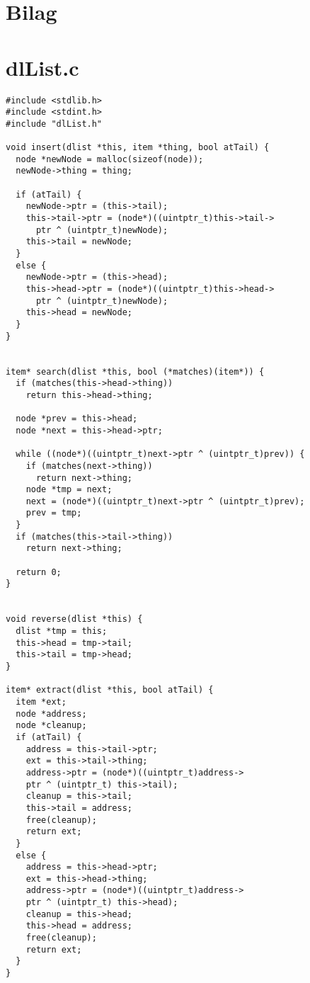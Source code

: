 \documentclass[a4paper,12pt]{article}
\begin{document}
\section*{Bilag}

\section*{dlList.c}
\begin{lstlisting}
#include <stdlib.h>
#include <stdint.h>
#include "dlList.h"

void insert(dlist *this, item *thing, bool atTail) {
  node *newNode = malloc(sizeof(node));
  newNode->thing = thing;

  if (atTail) {
    newNode->ptr = (this->tail);
    this->tail->ptr = (node*)((uintptr_t)this->tail->
      ptr ^ (uintptr_t)newNode);
    this->tail = newNode;
  }
  else {
    newNode->ptr = (this->head);
    this->head->ptr = (node*)((uintptr_t)this->head->
      ptr ^ (uintptr_t)newNode);
    this->head = newNode;
  }
}


item* search(dlist *this, bool (*matches)(item*)) {
  if (matches(this->head->thing))
    return this->head->thing;

  node *prev = this->head;
  node *next = this->head->ptr;

  while ((node*)((uintptr_t)next->ptr ^ (uintptr_t)prev)) {
    if (matches(next->thing))
      return next->thing;
    node *tmp = next;
    next = (node*)((uintptr_t)next->ptr ^ (uintptr_t)prev);
    prev = tmp;
  }
  if (matches(this->tail->thing))
    return next->thing;

  return 0;
}


void reverse(dlist *this) {
  dlist *tmp = this;
  this->head = tmp->tail;
  this->tail = tmp->head;
}

item* extract(dlist *this, bool atTail) {
  item *ext;
  node *address;
  node *cleanup;
  if (atTail) {
    address = this->tail->ptr;
    ext = this->tail->thing;
    address->ptr = (node*)((uintptr_t)address->
    ptr ^ (uintptr_t) this->tail);
    cleanup = this->tail;
    this->tail = address;
    free(cleanup);
    return ext;
  }
  else {
    address = this->head->ptr;
    ext = this->head->thing;
    address->ptr = (node*)((uintptr_t)address->
    ptr ^ (uintptr_t) this->head);
    cleanup = this->head;
    this->head = address;
    free(cleanup);
    return ext;
  }
}
\end{lstlisting}
\newpage
\end{document}
